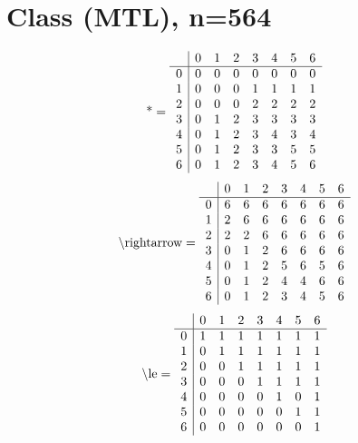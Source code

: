 \documentclass[11pt]{article}
\begin{document}
\section{Class (MTL), n=564}
\[\text{*} = 
\begin{array}{r | r r r r r r r}
 & 0 & 1 & 2 & 3 & 4 & 5 & 6 \\ \hline
0 & 0 & 0 & 0 & 0 & 0 & 0 & 0 \\
1 & 0 & 0 & 0 & 1 & 1 & 1 & 1 \\
2 & 0 & 0 & 0 & 2 & 2 & 2 & 2 \\
3 & 0 & 1 & 2 & 3 & 3 & 3 & 3 \\
4 & 0 & 1 & 2 & 3 & 4 & 3 & 4 \\
5 & 0 & 1 & 2 & 3 & 3 & 5 & 5 \\
6 & 0 & 1 & 2 & 3 & 4 & 5 & 6 \\
\end{array}
\]
\[\text{\textbackslash rightarrow} = 
\begin{array}{r | r r r r r r r}
 & 0 & 1 & 2 & 3 & 4 & 5 & 6 \\ \hline
0 & 6 & 6 & 6 & 6 & 6 & 6 & 6 \\
1 & 2 & 6 & 6 & 6 & 6 & 6 & 6 \\
2 & 2 & 2 & 6 & 6 & 6 & 6 & 6 \\
3 & 0 & 1 & 2 & 6 & 6 & 6 & 6 \\
4 & 0 & 1 & 2 & 5 & 6 & 5 & 6 \\
5 & 0 & 1 & 2 & 4 & 4 & 6 & 6 \\
6 & 0 & 1 & 2 & 3 & 4 & 5 & 6 \\
\end{array}
\]
\[\text{\textbackslash le} = 
\begin{array}{r | r r r r r r r}
 & 0 & 1 & 2 & 3 & 4 & 5 & 6 \\ \hline
0 & 1 & 1 & 1 & 1 & 1 & 1 & 1 \\
1 & 0 & 1 & 1 & 1 & 1 & 1 & 1 \\
2 & 0 & 0 & 1 & 1 & 1 & 1 & 1 \\
3 & 0 & 0 & 0 & 1 & 1 & 1 & 1 \\
4 & 0 & 0 & 0 & 0 & 1 & 0 & 1 \\
5 & 0 & 0 & 0 & 0 & 0 & 1 & 1 \\
6 & 0 & 0 & 0 & 0 & 0 & 0 & 1 \\
\end{array}
\]
\end{document}
